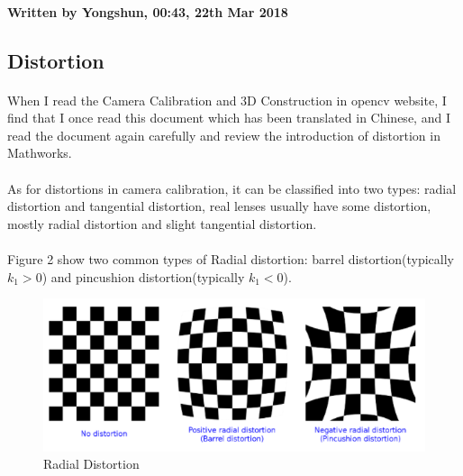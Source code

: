 \documentclass{article}
\begin{document}
\paragraph{Written by Yongshun, 00:43, 22th Mar 2018}

\subsection{Distortion}
\paragraph{}When I read the Camera Calibration and 3D Construction in opencv website\cite{OpencvCameraCalibration}, I find that I once read this document which has been translated in Chinese\cite{zhopencv}, and I read the document again carefully and review the introduction of distortion in Mathworks\cite{Intrinsic}.
\paragraph{}As for distortions in camera calibration, it can be classified into two types: radial distortion and tangential distortion, real lenses usually have some distortion, mostly radial distortion and slight tangential distortion.
\paragraph{}Figure 2 show two common types of Radial distortion: barrel distortion(typically $k_1>0$) and pincushion distortion(typically $k_1<0$).
\begin{figure}[H]
\centering
\includegraphics[scale=0.5]{2.png}
\caption{Radial Distortion}
\label{fig:label}
\end{figure}
\end{document}
